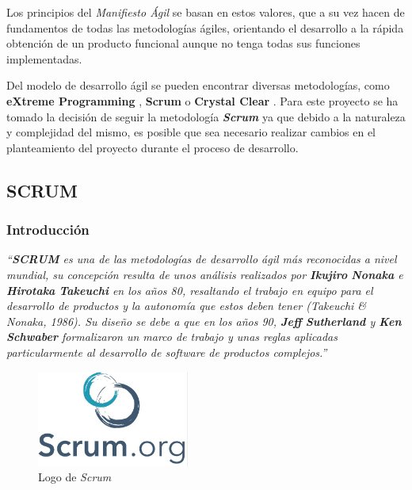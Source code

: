 Los principios del \textit{Manifiesto Ágil} se basan en estos valores, que a su vez hacen de fundamentos de 
todas las metodologías ágiles, orientando el desarrollo a la rápida obtención de un producto funcional 
aunque no tenga todas sus funciones implementadas. \medskip

Del modelo de desarrollo ágil se pueden encontrar diversas metodologías, como \textbf{eXtreme Programming} \autocite*{Stephens2003},
\textbf{Scrum} \autocite*{Schwaber2011} o \textbf{Crystal Clear} \autocite*{Cockburn2004}. 
Para este proyecto se ha tomado la decisión de seguir la metodología \textit{\textbf{Scrum}} ya que debido a la naturaleza y complejidad del mismo, 
es posible que sea necesario realizar cambios en el planteamiento del proyecto durante el proceso de desarrollo. \medskip

\subsection{SCRUM}
\subsubsection{Introducción}
\textit{“\textbf{SCRUM} es una de las metodologías de desarrollo ágil más reconocidas a nivel mundial, su concepción resulta de unos 
análisis realizados por \textbf{Ikujiro} \textbf{Nonaka} e \textbf{Hirotaka} \textbf{Takeuchi} en los años 80, resaltando el trabajo en equipo para el 
desarrollo de productos y la autonomía que estos deben tener (Takeuchi \& Nonaka, 1986). Su diseño se debe a que 
en los años 90, \textbf{Jeff} \textbf{Sutherland} y \textbf{Ken} \textbf{Schwaber} formalizaron un marco de trabajo y unas reglas aplicadas 
particularmente al desarrollo de software de productos complejos.”} \autocite*{Rodriguez} \medskip 

\begin{figure}[H]
    \centering
    \includegraphics[width=5cm]{Images/Logo_Scrum.jpeg}
    \caption{Logo de \textit{Scrum} \autocite*{ScrumLogo}}
\end{figure}

